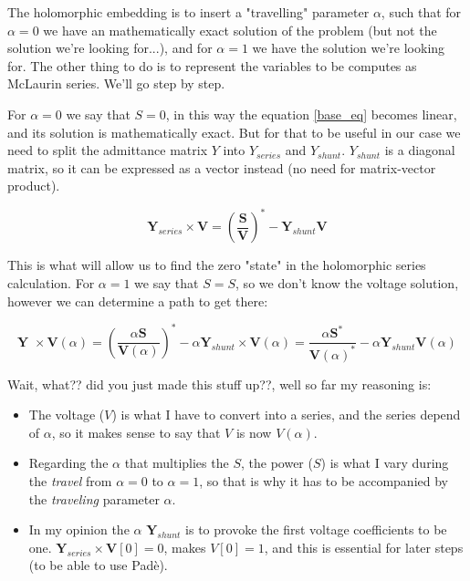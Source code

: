 \documentclass[11pt,fleqn]{book} %
\begin{document}
The holomorphic embedding is to insert a "travelling" parameter $\alpha$, such that for $\alpha=0$ we have an mathematically exact solution of the problem (but not the solution we're looking for...), and for $\alpha=1$ we have the solution we're looking for. The other thing to do is to represent the variables to be computes as McLaurin series. We'll go step by step.\newline

For $\alpha=0$ we say that $S=0$, in this way the equation \ref{base_eq} becomes linear, and its solution is mathematically exact. But for that to be useful in our case we need to split the admittance matrix $Y$ into $Y_{series}$ and $Y_{shunt}$. $Y_{shunt}$ is a diagonal matrix, so it can be expressed as a vector instead (no need for matrix-vector product).

\begin{equation}
\textbf{Y}_{series} \times \textbf{V} = \left(\frac{\textbf{S}}{\textbf{V}}\right)^* - \textbf{Y}_{shunt} \textbf{V}
\label{base_eq_alpha_0}
\end{equation}

This is what will allow us to find the zero "state" in the holomorphic series calculation. For $\alpha=1$ we say that $S=S$, so we don't know the voltage solution, however we can determine a path to get there:

\begin{equation}
{\textbf{Y }\times \textbf{V}( \alpha )} = \left(\frac{ \alpha\textbf{S}}{\textbf{V}( \alpha )}\right)^* - \alpha \textbf{Y}_{shunt} \times \textbf{V}( \alpha ) = \frac{ \alpha\textbf{S}^*}{\textbf{V}( \alpha )^*} - \alpha \textbf{Y}_{shunt} \textbf{V}( \alpha )
\label{base_eq_embedded}
\end{equation}

Wait, what?? did you just made this stuff up??, well so far my reasoning is:
\begin{itemize}
	\item The voltage ($V$) is what I have to convert into a series, and the series depend of $\alpha$, so it makes sense to say that $V$ is now $V(\alpha)$.
	
	\item Regarding the $\alpha$ that multiplies the $S$, the power ($S$) is what I vary during the \textit{travel} from $\alpha=0$ to $\alpha=1$, so that is why it has to be accompanied by the \textit{traveling} parameter $\alpha.$
	
	\item In my opinion the $\alpha$ $\textbf{Y}_{shunt}$ is to provoke the first voltage coefficients to be one.  $\textbf{Y}_{series} \times \textbf{V}[0] = 0$, makes $V[0]=1$, and this is essential for later steps (to be able to use Padè). \newline
\end{itemize}
\end{document}

